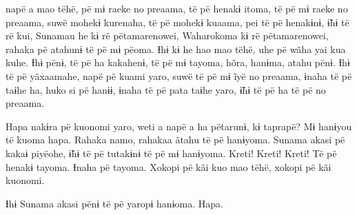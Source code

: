 napë a mao tëhë, pë mɨ raeke no preaama, të pë henakɨ itoma, të pë
mɨ raeke no preaama, suwë mohekɨ kurenaha, të pë mohekɨ kuaama, pei të
pë henakɨnɨ, ɨ̃hɨ të rë kui, Sunamau he kɨ rë pëtamarenowei, Waharokoma
kɨ rë pëtamarenowei, rahaka pë atahunɨ të pë mɨ pëoma. Ɨhɨ kɨ he hao mao
tëhë, uhe pë wãha yai kua kuhe. Ɨhɨ pënɨ, të pë ha kakahenɨ, të pë
mɨ tayoma, hõra, hanɨma, atahu pënɨ. Ɨhɨ të pë yãxaamahe, napë pë kuami
yaro, suwë të pë mɨ ĩyë no preaama, ɨnaha të pë taɨhe ha, huko si pë
hanɨɨ, ɨnaha të pë pata taɨhe yaro, ɨ̃hɨ të pë ha të pë no preaama. 

Hapa nakɨra pë kuonomi yaro, weti a napë a ha pëtarunɨ, kɨ taprapë?
Mɨ hanɨyou të kuoma hapa. Rahaka namo, rahakaa ãtahu të pë hanɨyoma.
Sunama akasi pë kakaɨ piyëohe, ɨ̃hɨ të pë tutakɨnɨ të pë mɨ hanɨyoma.
Kreti! Kreti! Kreti! Të pë henakɨ tayoma. Ɨnaha pë tayoma. Xokopi pë kãi
kuo mao tëhë, xokopi pë kãi kuonomi. 

Ɨhɨ Sunama akasi pënɨ të pë yaropɨ hanɨoma. Hapa. 
